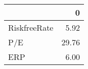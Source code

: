 \begin{tabular}{lr}
\toprule
{} &      0 \\
\midrule
RiskfreeRate &   5.92 \\
P/E          &  29.76 \\
ERP          &   6.00 \\
\bottomrule
\end{tabular}
